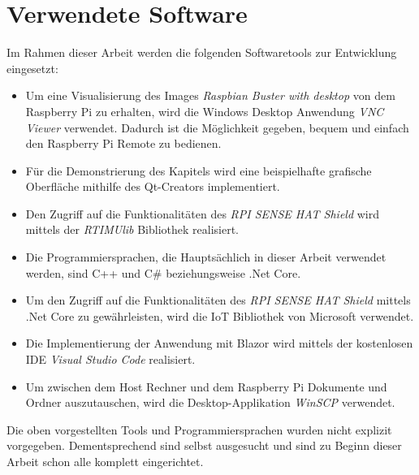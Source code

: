 \section{Verwendete Software}
\label{sec:verwendeteSoftware}
Im Rahmen dieser Arbeit werden die folgenden Softwaretools zur Entwicklung eingesetzt:
\begin{itemize}
    \item Um eine Visualisierung des Images \emph{Raspbian Buster with desktop} von dem Raspberry
    Pi zu erhalten, wird die Windows Desktop Anwendung \emph{VNC Viewer} verwendet. Dadurch ist
    die Möglichkeit gegeben, bequem und einfach den Raspberry Pi Remote zu bedienen.
    \item Für die Demonstrierung des Kapitels \emph{} wird eine
    beispielhafte grafische Oberfläche mithilfe des Qt-Creators implementiert.
    \item Den Zugriff auf die Funktionalitäten des \emph{RPI SENSE HAT Shield} wird mittels der
    \emph{RTIMUlib} Bibliothek realisiert.
    \item Die Programmiersprachen, die Hauptsächlich in dieser Arbeit verwendet werden, sind C++
    und C\# beziehungsweise .Net Core.
    \item Um den Zugriff auf die Funktionalitäten des \emph{RPI SENSE HAT Shield} mittels .Net
    Core zu gewährleisten, wird die IoT Bibliothek von Microsoft verwendet.
    \item Die Implementierung der Anwendung mit Blazor wird mittels der
    kostenlosen IDE \emph{Visual Studio Code} realisiert.
    \item Um zwischen dem Host Rechner und dem Raspberry Pi Dokumente und Ordner auszutauschen,
    wird die Desktop-Applikation \emph{WinSCP} verwendet.
\end{itemize}

Die oben vorgestellten Tools und Programmiersprachen wurden nicht explizit vorgegeben.
Dementsprechend sind selbst ausgesucht und sind zu Beginn dieser Arbeit schon alle
komplett eingerichtet.